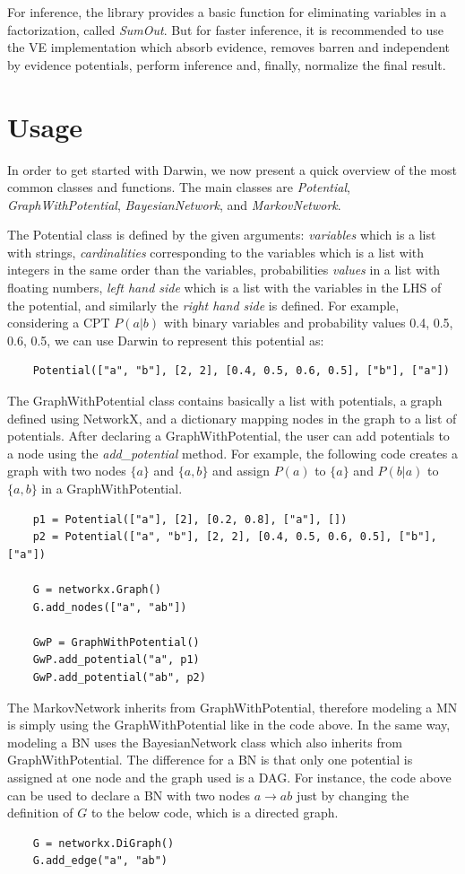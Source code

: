 For inference, the library provides a basic function for eliminating variables in a factorization, called \emph{SumOut}.
But for faster inference, it is recommended to use the VE implementation which absorb evidence, removes barren and independent by evidence potentials, perform inference and, finally, normalize the final result.

\section{Usage}
\label{sec:system:sec3}

In order to get started with Darwin, we now present a quick overview of the most common classes and functions.
The main classes are \emph{Potential}, \emph{GraphWithPotential}, \emph{BayesianNetwork}, and \emph{MarkovNetwork}.

The Potential class is defined by the given arguments: \emph{variables} which is a list with strings, \emph{cardinalities} corresponding to the variables which is a list with integers in the same order than the variables, probabilities \emph{values} in a list with floating numbers, \emph{left hand side} which is a list with the variables in the LHS of the potential, and similarly the \emph{right hand side} is defined.
For example, considering a CPT $P(a|b)$ with binary variables and probability values 0.4, 0.5, 0.6, 0.5, we can use Darwin to represent this potential as:
\begin{verbatim}
    Potential(["a", "b"], [2, 2], [0.4, 0.5, 0.6, 0.5], ["b"], ["a"])
\end{verbatim}

The GraphWithPotential class contains basically a list with potentials, a graph defined using NetworkX, and a dictionary mapping nodes in the graph to a list of potentials.
After declaring a GraphWithPotential, the user can add potentials to a node using the \emph{add\_potential} method.
For example, the following code creates a graph with two nodes $\{a\}$ and $\{a,b\}$ and assign $P(a)$ to $\{a\}$ and $P(b|a)$ to $\{a,b\}$ in a GraphWithPotential.
\begin{verbatim}
    p1 = Potential(["a"], [2], [0.2, 0.8], ["a"], [])
    p2 = Potential(["a", "b"], [2, 2], [0.4, 0.5, 0.6, 0.5], ["b"], ["a"])
    
    G = networkx.Graph()
    G.add_nodes(["a", "ab"])
    
    GwP = GraphWithPotential()
    GwP.add_potential("a", p1)
    GwP.add_potential("ab", p2)
\end{verbatim}

The MarkovNetwork inherits from GraphWithPotential, therefore modeling a MN is simply using the GraphWithPotential like in the code above.
In the same way, modeling a BN uses the BayesianNetwork class which also inherits from GraphWithPotential.
The difference for a BN is that only one potential is assigned at one node and the graph used is a DAG.
For instance, the code above can be used to declare a BN with two nodes $a \rightarrow ab$ just by changing the definition of $G$ to the below code, which is a directed graph.
\begin{verbatim}
    G = networkx.DiGraph()
    G.add_edge("a", "ab")
\end{verbatim}
